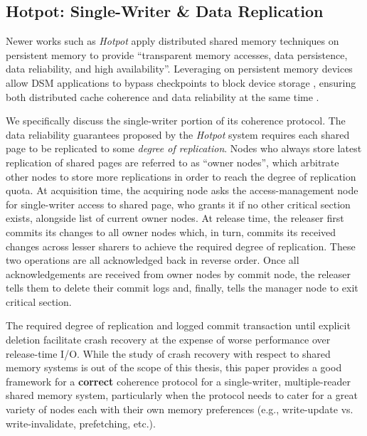 \documentclass{article}
\begin{document}

\subsection{Hotpot: Single-Writer \& Data Replication}
Newer works such as \textit{Hotpot}\cite{Shan_Tsai_Zhang.DSPM.2017} apply
distributed shared memory techniques on persistent memory to provide
``transparent memory accesses, data persistence, data reliability, and high
availability''. Leveraging on persistent memory devices allow DSM applications
to bypass checkpoints to block device storage \cite{Shan_Tsai_Zhang.DSPM.2017},
ensuring both distributed cache coherence and data reliability at the same time
\cite{Shan_Tsai_Zhang.DSPM.2017}.

We specifically discuss the single-writer portion of its coherence protocol. The
data reliability guarantees proposed by the \textit{Hotpot} system requires each
shared page to be replicated to some \textit{degree of replication}. Nodes
who always store latest replication of shared pages are referred to as
``owner nodes'', which arbitrate other nodes to store more replications in order
to reach the degree of replication quota. At acquisition time, the acquiring node
asks the access-management node for single-writer access to shared page,
who grants it if no other critical section exists, alongside list of current
owner nodes. At release time, the releaser first commits its changes to all owner
nodes which, in turn, commits its received changes across lesser sharers to
achieve the required degree of replication. These two operations are all
acknowledged back in reverse order. Once all acknowledgements are received from
owner nodes by commit node, the releaser tells them to delete their commit logs
and, finally, tells the manager node to exit critical section.

The required degree of replication and logged commit transaction until explicit
deletion facilitate crash recovery at the expense of worse performance over
release-time I/O. While the study of crash recovery with respect to shared
memory systems is out of the scope of this thesis, this paper provides a good
framework for a \textbf{correct} coherence protocol for a single-writer,
multiple-reader shared memory system, particularly when the protocol needs to
cater for a great variety of nodes each with their own memory preferences (e.g.,
write-update vs. write-invalidate, prefetching, etc.).
\end{document}
